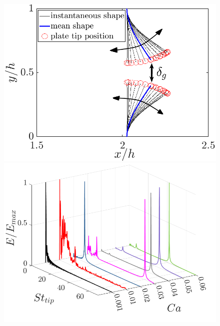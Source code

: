 \documentclass[%
aip,
amsmath,amssymb,
reprint,
]{revtex4-1}
\providecommand{\DIFaddbeginFL}{} %
\providecommand{\DIFaddendFL}{} %
\providecommand{\DIFdelbeginFL}{} %
\newcommand{\DIFscaledelfig}{0.5}
\newlength{\DIFdelgraphicswidth} %
\newlength{\DIFdelgraphicsheight} %
\newcommand{\DIFaddincludegraphics}[2][]{{\color{blue}\fbox{\DIFOincludegraphics[#1]{#2}}}} %
\newcommand{\DIFdelincludegraphics}[2][]{%
\sbox{\DIFdelgraphicsbox}{\DIFOincludegraphics[#1]{#2}}%
\settoboxwidth{\DIFdelgraphicswidth}{\DIFdelgraphicsbox} %
\settoboxtotalheight{\DIFdelgraphicsheight}{\DIFdelgraphicsbox} %
\scalebox{\DIFscaledelfig}{%
\parbox[b]{\DIFdelgraphicswidth}{\usebox{\DIFdelgraphicsbox}\\[-\baselineskip] \rule{\DIFdelgraphicswidth}{0em}}\llap{\resizebox{\DIFdelgraphicswidth}{\DIFdelgraphicsheight}{%
\setlength{\unitlength}{\DIFdelgraphicswidth}%
\begin{picture}(1,1)%
\thicklines\linethickness{2pt} %
{\color[rgb]{1,0,0}\put(0,0){\framebox(1,1){}}}%
{\color[rgb]{1,0,0}\put(0,0){\line( 1,1){1}}}%
{\color[rgb]{1,0,0}\put(0,1){\line(1,-1){1}}}%
\end{picture}%
}\hspace*{3pt}}} %
} %
\DeclareRobustCommand{\DIFaddbeginFL}{\DIFOaddbeginFL \let\includegraphics\DIFaddincludegraphics} %
\DeclareRobustCommand{\DIFaddendFL}{\DIFOaddendFL \let\includegraphics\DIFOincludegraphics} %
\DeclareRobustCommand{\DIFdelbeginFL}{\DIFOdelbeginFL \let\includegraphics\DIFdelincludegraphics} %
\begin{document}
	\begin{figure}
		\begin{center}
			\begin{minipage}[c]{0.5\linewidth}	
				\centering	
				\includegraphics[width=1\linewidth]{Figures/def_shape3.png}
				\DIFaddbeginFL \includegraphics[width=1\linewidth]{Figures/tipFreq/tip_freq_S_3D2}
			\DIFaddendFL \end{minipage}  
			\begin{minipage}[c]{0.49\linewidth}	
				\centering
				\DIFdelbeginFL %

\end{minipage}
\end{center}
\end{figure}
\end{document}
